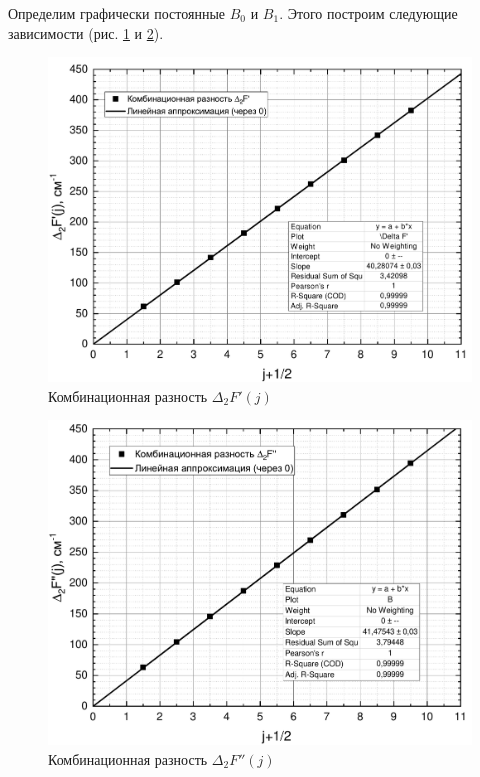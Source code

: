 Определим графически постоянные $B_0$ и $B_1$. Этого построим следующие зависимости (рис. \ref{deltaF'} и \ref{deltaF''}).

\begin{figure}[h!]
	\centering
	\includegraphics[height=0.5\textheight]{data/delta_F'}
	\caption{Комбинационная разность $\Delta_2F'(j)$}
	\label{deltaF'}
\end{figure}
\begin{figure}[h!]
	\centering
	\includegraphics[height=0.5\textheight]{data/delta_F''}
	\caption{Комбинационная разность $\Delta_2F''(j)$}
	\label{deltaF''}
\end{figure}

